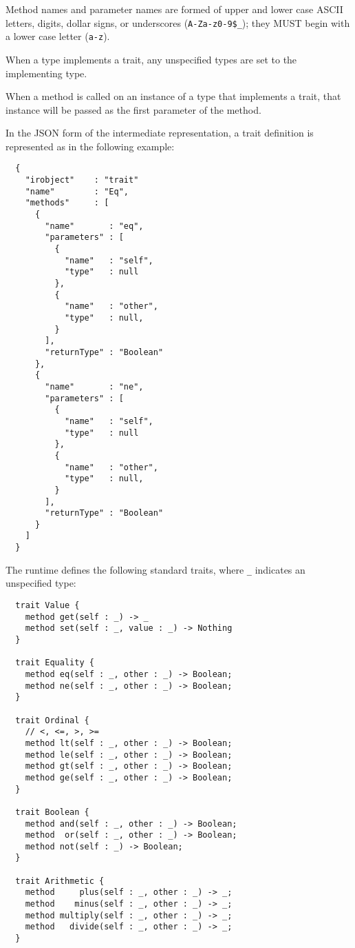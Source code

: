 \documentclass[10pt,twocolumn,a4paper]{article}
\newcommand{\code}[1]{\texttt{#1}}
\begin{document}
Method names and parameter names are formed of upper and lower case ASCII
letters, digits, dollar signs, or underscores (\code{A-Za-z0-9\$\_});
they MUST begin with a lower case letter (\code{a-z}).

When a type implements a trait, any unspecified types are set to the
implementing type.

When a method is called on an instance of a type that implements a trait,
that instance will be passed as the first parameter of the method.

In the JSON form of the intermediate representation, a trait definition is
represented as in the following example:
\footnotesize
\begin{verbatim}
  {
    "irobject"    : "trait"
    "name"        : "Eq",
    "methods"     : [
      {
        "name"       : "eq",
        "parameters" : [
          {
            "name"   : "self",
            "type"   : null
          },
          {
            "name"   : "other",
            "type"   : null,
          }
        ],
        "returnType" : "Boolean"
      },
      {
        "name"       : "ne",
        "parameters" : [
          {
            "name"   : "self",
            "type"   : null
          },
          {
            "name"   : "other",
            "type"   : null,
          }
        ],
        "returnType" : "Boolean"
      }
    ]
  }
\end{verbatim}
\normalsize


The runtime defines the following standard traits, where \verb|_| indicates
an unspecified type:
\footnotesize
\begin{verbatim}
  trait Value {
    method get(self : _) -> _
    method set(self : _, value : _) -> Nothing
  }

  trait Equality {
    method eq(self : _, other : _) -> Boolean;
    method ne(self : _, other : _) -> Boolean;
  }

  trait Ordinal {
    // <, <=, >, >=
    method lt(self : _, other : _) -> Boolean;
    method le(self : _, other : _) -> Boolean;
    method gt(self : _, other : _) -> Boolean;
    method ge(self : _, other : _) -> Boolean;
  }

  trait Boolean {
    method and(self : _, other : _) -> Boolean;
    method  or(self : _, other : _) -> Boolean;
    method not(self : _) -> Boolean;
  }

  trait Arithmetic {
    method     plus(self : _, other : _) -> _;
    method    minus(self : _, other : _) -> _;
    method multiply(self : _, other : _) -> _;
    method   divide(self : _, other : _) -> _;
  }
\end{verbatim}
\normalsize
\end{document}
